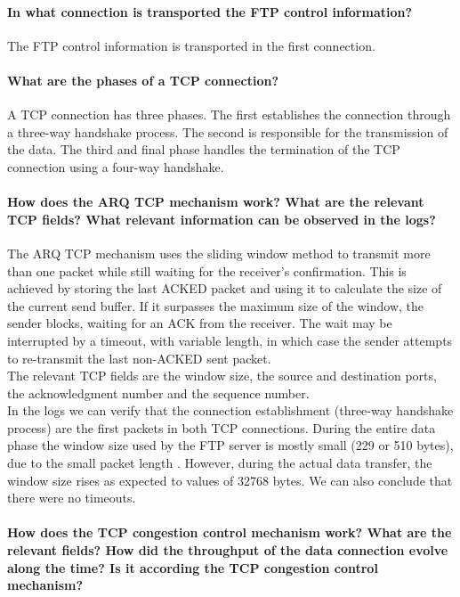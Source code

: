 \documentclass[11pt]{report}
\begin{document}
\paragraph{In what connection is transported the FTP control information?}
The FTP control information is transported in the first connection.

\paragraph{What are the phases of a TCP connection?}
A TCP connection has three phases. The first establishes the connection through
a three-way handshake process. The second is responsible for the transmission
of the data. The third and final phase handles the termination of the
TCP connection using a four-way handshake.

\paragraph{How does the ARQ TCP mechanism work? What are the relevant TCP fields?
What relevant information can be observed in the logs?}
The ARQ TCP mechanism uses the sliding window method to transmit more than one
packet while still waiting for the receiver's confirmation. This is achieved
by storing the last ACKED packet and using it to calculate the size of the
current send buffer. If it surpasses the maximum size of the window,
the sender blocks, waiting for an ACK from the receiver. The wait may be
interrupted by a timeout, with variable length, in which case the sender
attempts to re-transmit the last non-ACKED sent packet.\\
The relevant TCP fields are the window size, the source and destination ports,
the acknowledgment number and the sequence number.\\
In the logs we can verify that the connection establishment (three-way
handshake process) are the first packets in both TCP connections. During
the entire data phase the window size used by the FTP server is mostly
small (229 or 510 bytes), due to the small packet length . However,
during the actual data transfer, the window size rises as expected
to values of 32768 bytes. We can also conclude that there were no timeouts.

\paragraph{How does the TCP congestion control mechanism work? What are the
relevant fields? How did the throughput of the data connection evolve along
the time? Is it according the TCP congestion control mechanism?}
\end{document}
